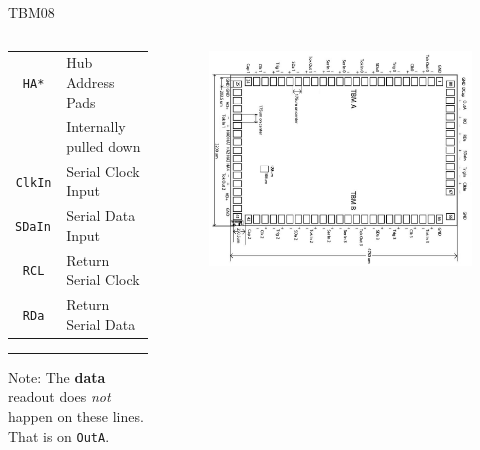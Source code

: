 \documentclass{beamer}
\begin{document}
\begin{frame}{TBM08}
    \begin{columns}
        \begin{column}{0.45\textwidth}
            {\scriptsize
            \begin{tabular}{c|l}
                 \texttt{HA*} & Hub Address Pads \\
                 & Internally pulled down \\
                 \texttt{ClkIn} & Serial Clock Input \\
                 \texttt{SDaIn }& Serial Data  Input\\
                 \texttt{RCL} & Return Serial Clock \\
                 \texttt{RDa} & Return Serial Data \\
            \end{tabular}
            }
            \vspace{.1in}
            \hrule
            \vspace{.1in}
            Note: The \textbf{data} readout does \emph{not} happen on these lines. That is on \texttt{OutA}.
        \end{column}
        \begin{column}{0.55\textwidth}
            \begin{figure}
                \includegraphics[angle=90, height=0.80\textheight]{"figures/TBM08"}
            \end{figure}
        \end{column}
    \end{columns}
\end{frame}
\end{document}
